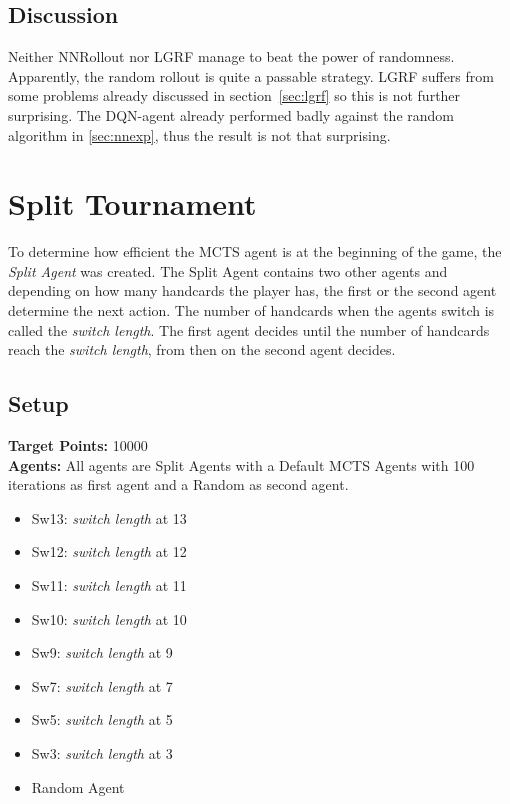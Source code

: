 \subsection*{Discussion}
Neither NNRollout nor LGRF manage to beat the power of randomness. Apparently, the random rollout is quite a passable strategy.
LGRF suffers from some problems already discussed in section~\ref{sec:lgrf} so this is not further surprising.
The DQN-agent already performed badly against the random algorithm in \ref{sec:nnexp}, thus the result is not that surprising.

\section{Split Tournament}
To determine how efficient the MCTS agent is at the beginning of the game, the \textit{Split Agent} was created. The Split Agent contains two other agents and depending on how many handcards the player has, the first or the second agent determine the next action. The number of handcards when the agents switch is called the \textit{switch length}. The first agent decides until the number of handcards reach the \textit{switch length}, from then on the second agent decides.

\subsection*{Setup}
\textbf{Target Points:} 10000\\
\textbf{Agents:}
All agents are Split Agents with a Default MCTS Agents with 100 iterations as first agent and a Random as second agent.
\begin{itemize}
    \setlength\itemsep{2px}
    \item Sw13: \textit{switch length} at 13
    \item Sw12: \textit{switch length} at 12
    \item Sw11: \textit{switch length} at 11
    \item Sw10: \textit{switch length} at 10
    \item Sw9: \textit{switch length} at 9
    \item Sw7: \textit{switch length} at 7
    \item Sw5: \textit{switch length} at 5
    \item Sw3: \textit{switch length} at 3
    \item Random Agent

\end{itemize}

